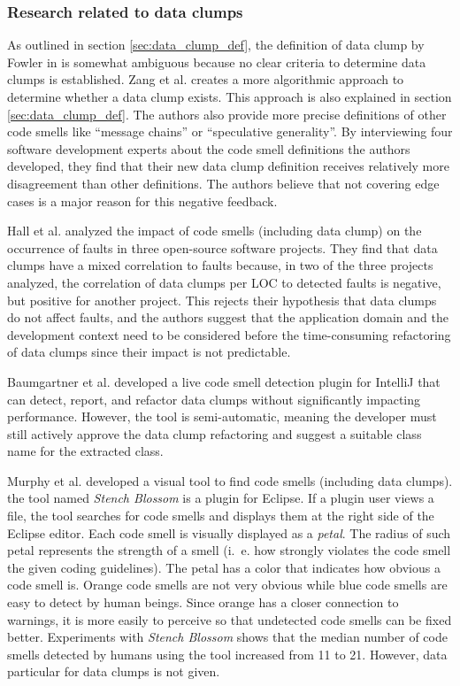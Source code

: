 \subsubsection{Research related to data clumps}

As outlined in section \ref{sec:data_clump_def}, the definition of data clump by Fowler in \cite{fowler2019refactoring} is somewhat ambiguous because no clear criteria to determine data clumps is established. Zang et al. \cite{zhangImprovingPrecisionFowler2008} creates a more algorithmic approach to determine whether a data clump exists. This approach is also explained in section \ref{sec:data_clump_def}. The authors also provide more precise definitions of other code smells like \enquote{message chains} or \enquote{speculative generality}. By interviewing four software development experts about the code smell definitions the authors developed, they find that their new data clump definition receives relatively more disagreement than other definitions. The authors believe  that not covering edge cases is a major reason for this negative feedback. 


Hall et al. analyzed the impact of code smells (including data clump) on the occurrence of faults in three open-source software projects. They find that data clumps have a mixed correlation to faults because, in two of the three projects analyzed, the correlation of data clumps per \ac{LOC} to detected faults is negative, but positive for another project. This rejects their hypothesis that data clumps do not affect faults, and the authors suggest that the application domain and the development context need to be considered before the time-consuming refactoring of data clumps since their impact is not predictable.  \cite{hallCodeSmellsHave2014}


Baumgartner et al. developed a live code smell detection plugin for IntelliJ that can detect, report, and refactor data clumps without significantly impacting performance. However, the tool is semi-automatic, meaning the developer must still actively approve the data clump refactoring and suggest a suitable class name for the extracted class. \cite{BaumgartnerAP23}

Murphy et al. \cite{stench_blossom} developed a visual tool to find code smells (including data clumps). the tool named \textit{Stench Blossom} is a plugin for Eclipse. If a plugin user views a file, the tool searches for code smells and displays them at the right side of the Eclipse editor. Each code smell is visually displayed as a \textit{petal}. The radius of such petal represents the strength of a smell (i.~e. how strongly violates the code smell the given coding guidelines). The petal has a color that indicates how obvious a code smell is. Orange code smells are not very obvious while blue code smells are easy to detect by human beings. Since orange has a closer connection to warnings, it is more easily to perceive so that undetected code smells can be fixed better. Experiments with \textit{Stench Blossom} shows that the median number of code smells detected by humans using the tool increased from 11 to 21. However, data particular for data clumps is not given.




